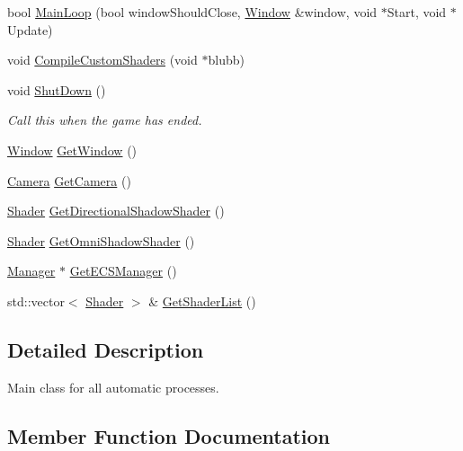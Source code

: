 \begin{DoxyCompactItemize}
\item 
bool \mbox{\hyperlink{class_root_manager_a2360a1eb38057900909fa7dcac3e9a28}{Main\+Loop}} (bool window\+Should\+Close, \mbox{\hyperlink{class_window}{Window}} \&window, void $\ast$Start, void $\ast$Update)
\item 
void \mbox{\hyperlink{class_root_manager_a1005d0d69109797ddf7e62fda5d678e5}{Compile\+Custom\+Shaders}} (void $\ast$blubb)
\item 
\mbox{\label{class_root_manager_aad25cd66fd1aa628a1ff265964d6ceec}} 
void \mbox{\hyperlink{class_root_manager_aad25cd66fd1aa628a1ff265964d6ceec}{Shut\+Down}} ()
\begin{DoxyCompactList}\small\item\em Call this when the game has ended. \end{DoxyCompactList}\item 
\mbox{\hyperlink{class_window}{Window}} \mbox{\hyperlink{class_root_manager_af5ee9d29d02ca9a8ca26bf0649862140}{Get\+Window}} ()
\item 
\mbox{\hyperlink{class_camera}{Camera}} \mbox{\hyperlink{class_root_manager_aeb1d6edd787d74c9a452d258c0ed6c28}{Get\+Camera}} ()
\item 
\mbox{\hyperlink{class_shader}{Shader}} \mbox{\hyperlink{class_root_manager_ad36825d276b3eb4e5499ff37c7673d9c}{Get\+Directional\+Shadow\+Shader}} ()
\item 
\mbox{\hyperlink{class_shader}{Shader}} \mbox{\hyperlink{class_root_manager_a19c55ac08aba56e6d7c2d44d33b61e75}{Get\+Omni\+Shadow\+Shader}} ()
\item 
\mbox{\hyperlink{class_manager}{Manager}} $\ast$ \mbox{\hyperlink{class_root_manager_a7990956f6ad217de97f7574880f5865b}{Get\+E\+C\+S\+Manager}} ()
\item 
std\+::vector$<$ \mbox{\hyperlink{class_shader}{Shader}} $>$ \& \mbox{\hyperlink{class_root_manager_ab51dc622d82953446e44ae4212e5220b}{Get\+Shader\+List}} ()
\end{DoxyCompactItemize}


\subsection{Detailed Description}
Main class for all automatic processes. 

\subsection{Member Function Documentation}
\mbox{\label{class_root_manager_a1005d0d69109797ddf7e62fda5d678e5}} 
